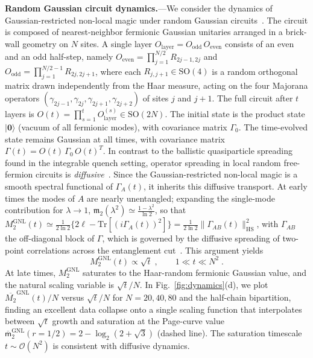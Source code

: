 \documentclass[aps,prl,twocolumn,superscriptaddress,reprint,longbibliography,nofootinbib]{revtex4-2}
\begin{document}
\textbf{Random Gaussian circuit dynamics.}---We consider the dynamics of Gaussian-restricted non-local magic under random Gaussian circuits~\cite{tirrito2025magicphasetransitionsmonitored}.
The circuit is composed of nearest-neighbor fermionic Gaussian unitaries arranged in a brick-wall geometry on $N$ sites.
A single layer $O_{\mathrm{layer}} = O_{\mathrm{odd}}\,O_{\mathrm{even}}$ consists of an even and an odd half-step, namely $O_{\mathrm{even}} = \prod_{j=1}^{N/2} R_{2j-1,2j}$ and $O_{\mathrm{odd}} = \prod_{j=1}^{N/2-1} R_{2j,2j+1}$, where each $R_{j,j+1} \in \mathrm{SO}(4)$ is a random orthogonal matrix drawn independently from the Haar measure, acting on the four Majorana operators $(\gamma_{2j-1}, \gamma_{2j}, \gamma_{2j+1}, \gamma_{2j+2})$ of sites $j$ and $j+1$.
The full circuit after $t$ layers is $O(t) = \prod_{s=1}^t O_{\mathrm{layer}}^{(s)} \in \mathrm{SO}(2N)$.
The initial state is the product state $|\mathbf{0}\rangle$ (vacuum of all fermionic modes), with covariance matrix $\Gamma_0$.
The time-evolved state remains Gaussian at all times, with covariance matrix $\Gamma(t) = O(t)\,\Gamma_0\,O(t)^T$.
In contrast to the ballistic quasiparticle spreading found in the integrable quench setting, operator spreading in local random free-fermion circuits is \emph{diffusive}~\cite{dias2021diffusiveoperatorspreadingrandom,swann}.
Since the Gaussian-restricted non-local magic is a smooth spectral functional of $\Gamma_A(t)$, it inherits this diffusive transport.
At early times the modes of $A$ are nearly unentangled; expanding the single-mode contribution for $\lambda\to1$, $\mathfrak{m}_2(\lambda^2) \simeq \frac{1-\lambda^2}{\ln 2}$, so that $M_2^{\mathrm{GNL}}(t) \simeq \frac{1}{2\ln 2}\{2\ell-\mathrm{Tr}[(i\Gamma_A(t))^2]\}=\frac{1}{2\ln 2}\|\Gamma_{AB}(t)\|_{\mathrm{HS}}^2$, with $\Gamma_{AB}$ the off-diagonal block of $\Gamma$, which is governed by the diffusive spreading of two-point correlations across the entanglement cut~\cite{dias2021diffusiveoperatorspreadingrandom}.
This argument yields
\begin{equation}
    M_2^{\mathrm{GNL}}(t) \propto \sqrt{t}\;, \qquad 1 \ll t \ll N^2\;.
\end{equation}
At late times, $M_2^{\mathrm{GNL}}$ saturates to the Haar-random fermionic Gaussian value, and the natural scaling variable is $\sqrt{t}/N$.
In Fig.~\ref{fig:dynamics}(d), we plot $\overline{M_2}^{\mathrm{GNL}}(t)/N$ versus $\sqrt{t}/N$ for $N = 20, 40, 80$ and the half-chain bipartition, finding an excellent data collapse onto a single scaling function that interpolates between $\sqrt{t}$ growth and saturation at the Page-curve value $\overline{\mathsf{m}}_{2}^{\mathrm{GNL}}(r=1/2)=2-\log_2(2+\sqrt{3})$  (dashed line).
The saturation timescale $t\sim\mathcal{O}(N^2)$ is consistent with diffusive dynamics.
\end{document}
